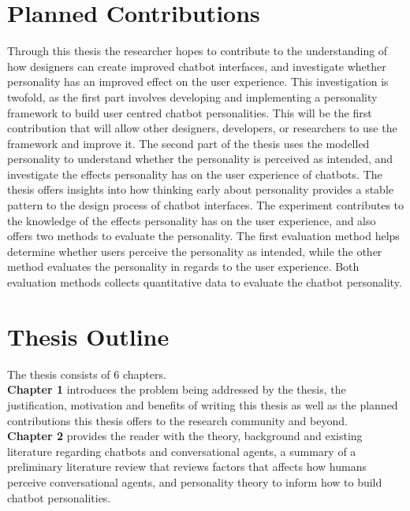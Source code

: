 \section{Planned Contributions}
Through this thesis the researcher hopes to contribute to the understanding of how designers can create improved chatbot interfaces, and investigate whether personality has an improved effect on the user experience. This investigation is twofold, as the first part involves developing and implementing a personality framework to build user centred chatbot personalities. This will be the first contribution that will allow other designers, developers, or researchers to use the framework and improve it. The second part of the thesis uses the modelled personality to understand whether the personality is perceived as intended, and investigate the effects personality has on the user experience of chatbots. The thesis offers insights into how thinking early about personality provides a stable pattern to the design process of chatbot interfaces. The experiment contributes to the knowledge of the effects personality has on the user experience, and also offers two methods to evaluate the personality. The first evaluation method helps determine whether users perceive the personality as intended, while the other method evaluates the personality in regards to the user experience. Both evaluation methods collects quantitative data to evaluate the chatbot personality.

\vspace{5mm} %

\section{Thesis Outline}

The thesis consists of 6 chapters.\\

\textbf{Chapter 1} introduces the problem being addressed by the thesis, the justification, motivation and benefits of writing this thesis as well as the planned contributions this thesis offers to the research community and beyond.\\

\textbf{Chapter 2} provides the reader with the theory, background and existing literature regarding chatbots and conversational agents, a summary of a preliminary literature review that reviews factors that affects how humans perceive conversational agents, and personality theory to inform how to build chatbot personalities.\\

